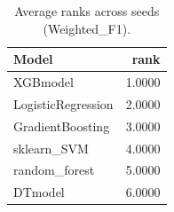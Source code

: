 \begin{table}[t]
\centering
\begin{tabular}{lr}
\toprule
Model & rank \\
\midrule
XGBmodel & 1.0000 \\
LogisticRegression & 2.0000 \\
GradientBoosting & 3.0000 \\
sklearn_SVM & 4.0000 \\
random_forest & 5.0000 \\
DTmodel & 6.0000 \\
\bottomrule
\end{tabular}
\caption{Average ranks across seeds (Weighted_F1).}
\label{tab:avg_rank_Weighted_F1}
\end{table}